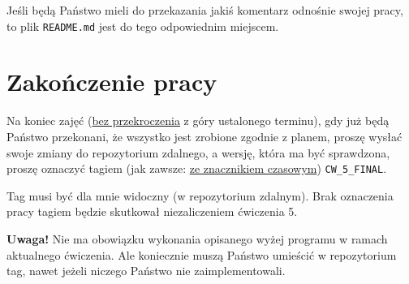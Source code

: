 \documentclass[twoside]{article}
\begin{document}
Jeśli będą Państwo mieli do przekazania jakiś komentarz odnośnie swojej pracy, to plik 
\verb|README.md| jest do tego odpowiednim miejscem.


\section{Zakończenie pracy}
Na koniec zajęć (\underline{bez przekroczenia} z góry ustalonego terminu), gdy już będą Państwo
przekonani, że wszystko jest zrobione zgodnie z planem, proszę wysłać swoje zmiany do repozytorium zdalnego, a wersję, która ma być sprawdzona, proszę oznaczyć tagiem (jak zawsze: 
\underline{ze znacznikiem czasowym}) \verb|CW_5_FINAL|.

Tag musi być dla mnie widoczny (w repozytorium zdalnym).
Brak oznaczenia pracy tagiem będzie skutkował niezaliczeniem ćwiczenia 5.

\textbf{Uwaga!} Nie ma obowiązku wykonania opisanego wyżej programu w ramach aktualnego ćwiczenia.
Ale koniecznie muszą Państwo umieścić w repozytorium tag, nawet jeżeli niczego Państwo nie zaimplementowali.
\end{document}
